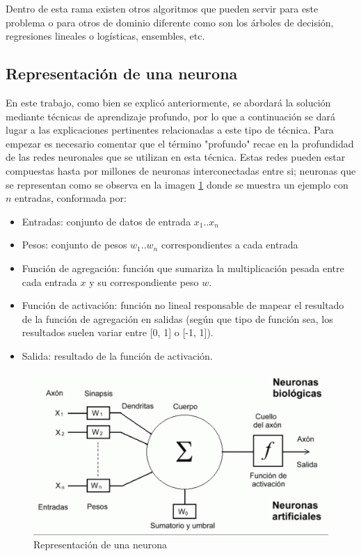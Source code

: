  Dentro de esta rama existen otros algoritmos que pueden servir para este problema o para otros de dominio diferente como son los árboles de decisión, regresiones lineales o logísticas, ensembles, etc.
 
\subsection{Representación de una neurona}
 En este trabajo, como bien se explicó anteriormente, se abordará la solución mediante técnicas de aprendizaje profundo, por lo que a continuación se dará lugar a las explicaciones pertinentes relacionadas a este tipo de técnica.
 Para empezar es necesario comentar que el término "profundo" recae en la profundidad de las redes neuronales que se utilizan en esta técnica. Estas redes pueden estar compuestas hasta por millones de neuronas interconectadas entre si; neuronas que se representan como se observa en la imagen \ref{fig:representacion_neurona} donde se muestra un ejemplo con \(n\) entradas, conformada por: 
 \begin{itemize}
 	\item Entradas: conjunto de datos de entrada \(x_1\)..\(x_n\)
 	\item Pesos: conjunto de pesos \(w_1\)..\(w_n\) correspondientes a cada entrada
 	\item Función de agregación: función que sumariza la multiplicación pesada entre cada entrada \(x\) y su correspondiente peso \(w\).
	\item Función de activación: función no lineal responsable de mapear el resultado de la función de agregación en salidas (según que tipo de función sea, los resultados suelen variar entre [0, 1] o [-1, 1]).
	\item Salida: resultado de la función de activación.
 \end{itemize}
 
 
\begin{figure}[!h]
\centering
\includegraphics[width=.8\linewidth]{images/representacion_neurona}
\caption[Representación de una neurona]{Representación de una neurona}
\label{fig:representacion_neurona}
\end{figure}

